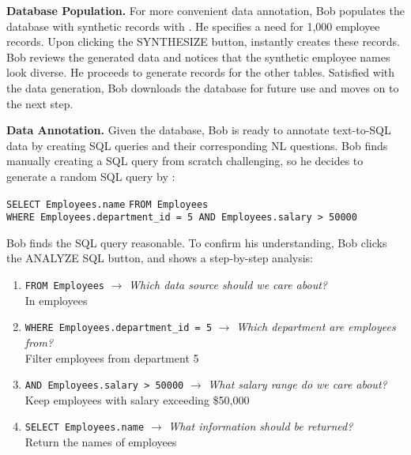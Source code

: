 \textbf{Database Population.}
For more convenient data annotation, Bob populates the database with synthetic records with {\tool}. He specifies a need for 1,000 employee records. Upon clicking the SYNTHESIZE button, {\tool} instantly creates these records. Bob reviews the generated data and notices that the synthetic employee names look diverse. He proceeds to generate records for the other tables. Satisfied with the data generation, Bob downloads the database for future use and moves on to the next step.


\textbf{Data Annotation.}
Given the database, Bob is ready to annotate text-to-SQL data by creating SQL queries and their corresponding NL questions.
Bob finds manually creating a SQL query from scratch challenging, so he decides to generate a random SQL query by {\tool}:

\begin{center}
\texttt{\textcolor[RGB]{172,41,0}{SELECT} Employees.name} \texttt{\textcolor[RGB]{172,41,0}{FROM} Employees} \\
\texttt{\textcolor[RGB]{172,41,0}{WHERE} Employees.department\_id = 5 \textcolor[RGB]{172,41,0}{AND} Employees.salary > 50000}
\end{center}



Bob finds the SQL query reasonable. To confirm his understanding, Bob clicks the ANALYZE SQL button, and {\tool} shows a step-by-step analysis:

\begin{enumerate}
    \item \texttt{\textcolor[RGB]{172,41,0}{FROM} Employees} $\rightarrow$ \textit{Which data source should we care about?} 
          \\ \colorbox[rgb]{0.95,0.95,0.95}{In employees} 
        
    
    \item \texttt{\textcolor[RGB]{172,41,0}{WHERE} Employees.department\_id = 5} $\rightarrow$ \textit{Which department are employees from?} 
          \\ \colorbox[rgb]{0.95,0.95,0.95}{Filter employees from department 5} 
          
    
    \item \texttt{\textcolor[RGB]{172,41,0}{AND} Employees.salary > 50000} $\rightarrow$ \textit{What salary range do we care about?} 
          \\ \colorbox[rgb]{0.95,0.95,0.95}{Keep employees with salary exceeding \$50,000} 
          
    
    \item \texttt{\textcolor[RGB]{172,41,0}{SELECT} Employees.name} $\rightarrow$ \textit{What information should be returned?} 
          \\ \colorbox[rgb]{0.95,0.95,0.95}{Return the names of employees} 
        
\end{enumerate}

